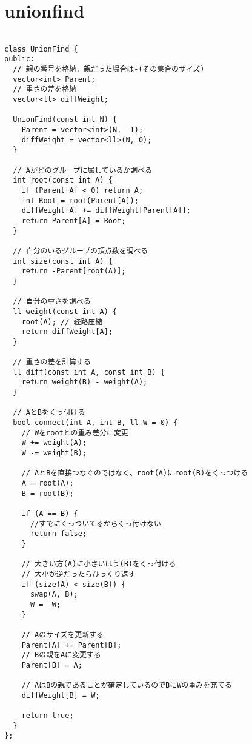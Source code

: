 \documentclass{jsarticle}
\begin{document}
\section{unionfind}
\color{black}
\begin{lstlisting}[caption=unionfind]

class UnionFind {
public:
  // 親の番号を格納．親だった場合は-(その集合のサイズ)
  vector<int> Parent;
  // 重さの差を格納
  vector<ll> diffWeight;

  UnionFind(const int N) {
    Parent = vector<int>(N, -1);
    diffWeight = vector<ll>(N, 0);
  }

  // Aがどのグループに属しているか調べる
  int root(const int A) {
    if (Parent[A] < 0) return A;
    int Root = root(Parent[A]);
    diffWeight[A] += diffWeight[Parent[A]];
    return Parent[A] = Root;
  }

  // 自分のいるグループの頂点数を調べる
  int size(const int A) {
    return -Parent[root(A)];
  }

  // 自分の重さを調べる
  ll weight(const int A) {
    root(A); // 経路圧縮
    return diffWeight[A];
  }

  // 重さの差を計算する
  ll diff(const int A, const int B) {
    return weight(B) - weight(A);
  }

  // AとBをくっ付ける
  bool connect(int A, int B, ll W = 0) {
    // Wをrootとの重み差分に変更
    W += weight(A);
    W -= weight(B);

    // AとBを直接つなぐのではなく、root(A)にroot(B)をくっつける
    A = root(A);
    B = root(B);

    if (A == B) {
      //すでにくっついてるからくっ付けない
      return false;
    }

    // 大きい方(A)に小さいほう(B)をくっ付ける
    // 大小が逆だったらひっくり返す
    if (size(A) < size(B)) {
      swap(A, B);
      W = -W;
    }

    // Aのサイズを更新する
    Parent[A] += Parent[B];
    // Bの親をAに変更する
    Parent[B] = A;

    // AはBの親であることが確定しているのでBにWの重みを充てる
    diffWeight[B] = W;

    return true;
  }
};

\end{lstlisting}

\color{white}
\end{document}
